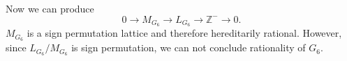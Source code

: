 \documentclass{article}
\theoremstyle{plain}
\theoremstyle{definition}
\newcommand{\Z}{\ensuremath{\mathbb{Z}}}
\newcommand{\tand}{\ensuremath{\,\,\, \text{and} \,\,\,}}
\newcommand{\exactseqs}[1]{\ensuremath{0 \longrightarrow M_{#1} \longrightarrow L_{#1} \longrightarrow \Z^{-} \longrightarrow 0}}
\begin{document}
Now we can produce
$$
\exactseqs{G_6}
.$$
$M_{G_6}$ is a sign permutation lattice and therefore hereditarily rational. However, since $L_{G_6}/M_{G_6}$ is sign permutation, we can not conclude rationality of $G_6$.
%
%
%
%
%
%
%
%
%
%
\end{document}
